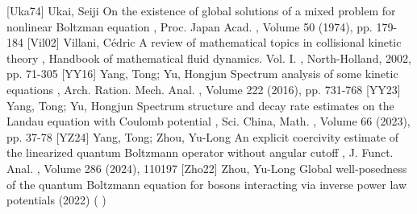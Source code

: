  [Uka74] Ukai, Seiji On the existence of global solutions of a mixed problem for nonlinear Boltzman equation , Proc. Japan Acad. , Volume 50 (1974), pp. 179-184
 [Vil02] Villani, Cédric A review of mathematical topics in collisional kinetic theory , Handbook of mathematical fluid dynamics. Vol. I. , North-Holland, 2002, pp. 71-305
 [YY16] Yang, Tong; Yu, Hongjun Spectrum analysis of some kinetic equations , Arch. Ration. Mech. Anal. , Volume 222 (2016), pp. 731-768
 [YY23] Yang, Tong; Yu, Hongjun Spectrum structure and decay rate estimates on the Landau equation with Coulomb potential , Sci. China, Math. , Volume 66 (2023), pp. 37-78
 [YZ24] Yang, Tong; Zhou, Yu-Long An explicit coercivity estimate of the linearized quantum Boltzmann operator without angular cutoff , J. Funct. Anal. , Volume 286 (2024), 110197
 [Zho22] Zhou, Yu-Long Global well-posedness of the quantum Boltzmann equation for bosons interacting via inverse power law potentials (2022) ( )
